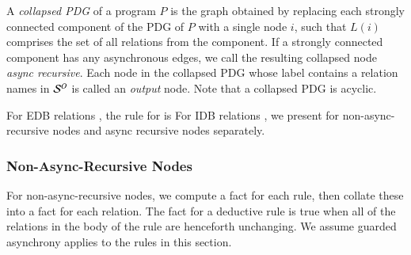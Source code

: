
A {\em collapsed PDG} of a \lang program $P$ is the graph obtained by replacing each strongly
connected component of the PDG of $P$ with a single node $i$, such that $L(i)$
comprises
the set of all relations from the component.  If a strongly connected
component has any asynchronous edges, we call the resulting collapsed node {\em
  async recursive}.  Each node in the collapsed PDG whose label contains a
relation names in $\oschema$ is called an {\em output} node.  Note that a
collapsed PDG is acyclic.

For EDB relations , the rule for  is   For IDB relations , we present  for non-async-recursive nodes and async recursive nodes separately.



\subsubsection{Non-Async-Recursive Nodes}
\label{sec:nonasyncrecursive}

For non-async-recursive nodes, we compute a  fact for each
rule, then collate these into a  fact for each relation.  
The  fact for a deductive rule is true when all of the relations in the body of the
rule are henceforth unchanging.
We assume guarded asynchrony applies to the rules in this section.

